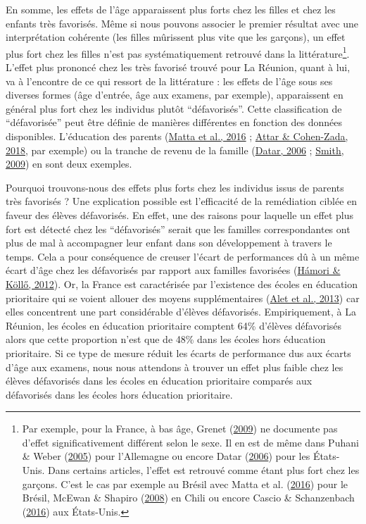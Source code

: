 \documentclass[
]{book}
\begin{document}
\quad En somme, les effets de l'âge apparaissent plus forts chez les filles et chez les enfants très favorisés. Même si nous pouvons associer le premier résultat avec une interprétation cohérente (les filles mûrissent plus vite que les garçons), un effet plus fort chez les filles n'est pas systématiquement retrouvé dans la littérature\footnote{Par exemple, pour la France, à bas âge, Grenet (\protect\hyperlink{ref-GRE:09}{2009}) ne documente pas d'effet significativement différent selon le sexe. Il en est de même dans Puhani \& Weber (\protect\hyperlink{ref-PUH:WEB:05}{2005}) pour l'Allemagne ou encore Datar (\protect\hyperlink{ref-DAT:06}{2006}) pour les États-Unis. Dans certains articles, l'effet est retrouvé comme étant plus fort chez les garçons. C'est le cas par exemple au Brésil avec Matta et al. (\protect\hyperlink{ref-MAT:eal:16}{2016}) pour le Brésil, McEwan \& Shapiro (\protect\hyperlink{ref-MCE:SHA:08}{2008}) en Chili ou encore Cascio \& Schanzenbach (\protect\hyperlink{ref-CAS:SCH:16}{2016}) aux États-Unis.}.\\
L'effet plus prononcé chez les très favorisé trouvé pour La Réunion, quant à lui, va à l'encontre de ce qui ressort de la littérature : les effets de l'âge sous ses diverses formes (âge d'entrée, âge aux examens, par exemple), apparaissent en général plus fort chez les individus plutôt ``défavorisés''. Cette classification de ``défavorisée'' peut être définie de manières différentes en fonction des données disponibles. L'éducation des parents (\protect\hyperlink{ref-MAT:eal:16}{Matta et al., 2016} ; \protect\hyperlink{ref-ATT:COH:18}{Attar \& Cohen-Zada, 2018}, par exemple) ou la tranche de revenu de la famille (\protect\hyperlink{ref-DAT:06}{Datar, 2006} ; \protect\hyperlink{ref-SMI:09}{Smith, 2009}) en sont deux exemples.

\quad Pourquoi trouvons-nous des effets plus forts chez les individus issus de parents très favorisés ? Une explication possible est l'efficacité de la remédiation ciblée en faveur des élèves défavorisés. En effet, une des raisons pour laquelle un effet plus fort est détecté chez les ``défavorisés'' serait que les familles correspondantes ont plus de mal à accompagner leur enfant dans son développement à travers le temps. Cela a pour conséquence de creuser l'écart de performances dû à un même écart d'âge chez les défavorisés par rapport aux familles favorisées (\protect\hyperlink{ref-HAM:KOL:12}{Hámori \& Köllő, 2012}). Or, la France est caractérisée par l'existence des écoles en éducation prioritaire qui se voient allouer des moyens supplémentaires (\protect\hyperlink{ref-ALE:eal:13}{Alet et al., 2013}) car elles concentrent une part considérable d'élèves défavorisés. Empiriquement, à La Réunion, les écoles en éducation prioritaire comptent 64\% d'élèves défavorisés alors que cette proportion n'est que de 48\% dans les écoles hors éducation prioritaire. Si ce type de mesure réduit les écarts de performance dus aux écarts d'âge aux examens, nous nous attendons à trouver un effet plus faible chez les élèves défavorisés dans les écoles en éducation prioritaire comparés aux défavorisés dans les écoles hors éducation prioritaire.
\end{document}

